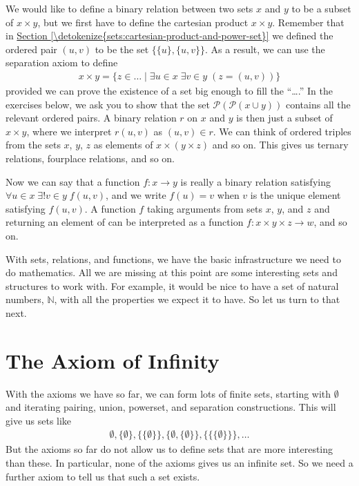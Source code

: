 \documentclass[letterpaper,10pt,english]{sphinxmanual}
\begin{document}
\sphinxAtStartPar
We would like to define a binary relation between two sets \(x\) and \(y\) to be a subset of \(x \times y\), but we first have to define the cartesian product \(x \times y\). Remember that in \hyperref[\detokenize{sets:cartesian-product-and-power-set}]{Section \ref{\detokenize{sets:cartesian-product-and-power-set}}} we defined the ordered pair \((u, v)\) to be the set \(\{ \{ u \}, \{ u, v \} \}\). As a result, we can use the separation axiom to define
\begin{equation*}
\begin{split}x \times y = \{ z \in \ldots \mid \exists u \in x \; \exists v \in y \; (z = (u, v)) \}\end{split}
\end{equation*}
\sphinxAtStartPar
provided we can prove the existence of a set big enough to fill the “….” In the exercises below, we ask you to show that the set \(\mathcal P (\mathcal P (x \cup y))\) contains all the relevant ordered pairs. A binary relation \(r\) on \(x\) and \(y\) is then just a subset of \(x \times y\), where we interpret \(r(u, v)\) as \((u, v) \in r\). We can think of ordered triples from the sets \(x\), \(y\), \(z\) as elements of \(x \times (y \times z)\) and so on. This gives us ternary relations, four\sphinxhyphen{}place relations, and so on.

\sphinxAtStartPar
Now we can say that a function \(f : x \to y\) is really a binary relation satisfying \(\forall u \in x \; \exists! v \in y \; f(u, v)\), and we write \(f(u) = v\) when \(v\) is the unique element satisfying \(f(u, v)\). A function \(f\) taking arguments from sets \(x\), \(y\), and \(z\) and returning an element of  can be interpreted as a function \(f : x \times y \times z \to w\), and so on.

\sphinxAtStartPar
With sets, relations, and functions, we have the basic infrastructure we need to do mathematics. All we are missing at this point are some interesting sets and structures to work with. For example, it would be nice to have a set of natural numbers, \(\mathbb{N}\), with all the properties we expect it to have. So let us turn to that next.


\section{The Axiom of Infinity}
\label{\detokenize{axiomatic_foundations:the-axiom-of-infinity}}
\sphinxAtStartPar
With the axioms we have so far, we can form lots of finite sets, starting with \(\emptyset\) and iterating pairing, union, powerset, and separation constructions. This will give us sets like
\begin{equation*}
\begin{split}\emptyset, \{ \emptyset \}, \{ \{ \emptyset \} \}, \{ \emptyset, \{ \emptyset \} \}, \{ \{ \{ \emptyset \} \} \}, \ldots\end{split}
\end{equation*}
\sphinxAtStartPar
But the axioms so far do not allow us to define sets that are more interesting than these. In particular, none of the axioms gives us an infinite set. So we need a further axiom to tell us that such a set exists.
\end{document}
